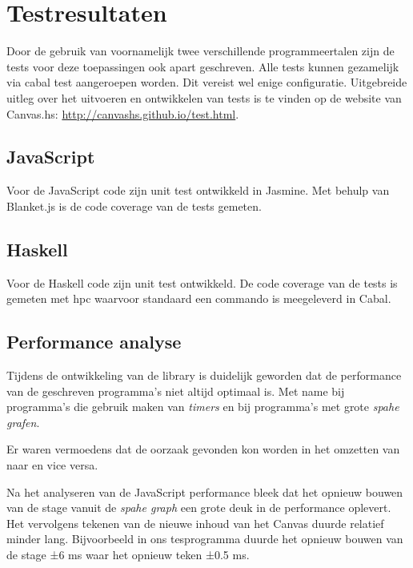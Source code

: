 \section{Testresultaten} \label{sec:testresultaten}


Door de gebruik van voornamelijk twee verschillende programmeertalen zijn de tests voor deze toepassingen ook apart geschreven. Alle tests kunnen gezamelijk via cabal test aangeroepen worden. Dit vereist wel enige configuratie. Uitgebreide uitleg over het uitvoeren en ontwikkelen van tests is te vinden op de website van Canvas.hs: \url{http://canvashs.github.io/test.html}.

\subsection{JavaScript}
Voor de JavaScript code zijn unit test ontwikkeld in Jasmine. Met behulp van Blanket.js is de code coverage van de tests gemeten.

\subsection{Haskell}
Voor de Haskell code zijn unit test ontwikkeld. De code coverage van de tests is gemeten met hpc waarvoor standaard een commando is meegeleverd in Cabal.

\subsection{Performance analyse}
Tijdens de ontwikkeling van de library is duidelijk geworden dat de performance van de geschreven programma's niet altijd optimaal is. Met name bij programma's die gebruik maken van \emph{timers} en bij programma's met grote \emph{spahe grafen}.


Er waren vermoedens dat de oorzaak gevonden kon worden in het omzetten van  naar  en vice versa.

Na het analyseren van de JavaScript performance bleek dat het opnieuw bouwen van de stage vanuit de \emph{spahe graph} een grote deuk in de performance oplevert. Het vervolgens tekenen van de nieuwe inhoud van het Canvas duurde relatief minder lang. Bijvoorbeeld in ons tesprogramma duurde het opnieuw bouwen van de stage ±6 ms waar het opnieuw teken ±0.5 ms.


